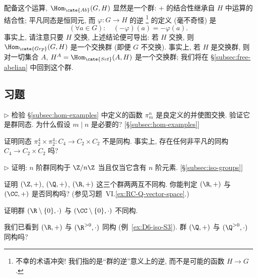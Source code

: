 配备这个运算, $\Hom_{\cate{Ab}}(G, H)$ 显然是一个群: $+$ 的结合性继承自 $H$ 中运算的结合性; 平凡同态是恒同元, 而 $\varphi : G \to H$ 的逆%
\footnote{不幸的术语冲突! 我们指的是``群的逆''意义上的逆, 而不是可能的函数 $H \to G$.}%
的定义 (毫不奇怪) 是
\[
(\forall a \in G): \quad (-\varphi)(a) = -\varphi(a).
\]
事实上, 请注意只要 $H$ 交换, 上述结论便可导出: 若 $H$ 交换, 则 $\Hom_{\cate{Grp}}(G, H)$ 是一个交换群 (即便 $G$ 不交换). 事实上, 若 $H$ 是交换群, 则对一切集合 $A$, $H^A = \Hom_{\cate{Set}}(A, H)$ 是一个交换群; 我们将在 \S\ref{subsec:free-abelian} 中回到这个群.

\subsection*{习题}
{}

\begin{prob}
\label{ex:pi-welldef}
$\triangleright$ 检验 \S\ref{subsec:hom-examples} 中定义的函数 $\pi_m^n$ 是良定义的并使图交换. 验证它是群同态. 为什么假设 $m \mid n$ 是必要的? [\S\ref{subsec:hom-examples}]
\end{prob}

\begin{prob}
\label{ex:c4-c2c2}
证明同态 $\pi_2^4 \times \pi_2^4 : C_4 \to C_2 \times C_2$ 不是同构. 事实上, 存在任何非平凡的同构 $C_4 \to C_2 \times C_2$ 吗?
\end{prob}

\begin{prob}
\label{ex:cyclic-element-order}
$\triangleright$ 证明: $n$ 阶群同构于 $\Z/n\Z$ 当且仅当它含有 $n$ 阶元素. [\S\ref{subsec:iso-groups}]
\end{prob}

\begin{prob}
\label{ex:zqr-not-iso}
证明 $(\Z, +)$, $(\Q, +)$, $(\R, +)$ 这三个群两两互不同构. 你能判定 $(\R, +)$ 与 $(\CC, +)$ 是否同构吗? (参见习题~VI.\ref{ex:RC-Q-vector-space}.)
\end{prob}

\begin{prob}
\label{ex:R-C-not-iso}
证明群 $(\R \setminus \{0\}, \cdot)$ 与 $(\CC \setminus \{0\}, \cdot)$ 不同构.
\end{prob}

\begin{prob}
\label{ex:Q-positive}
我们已看到 $(\R, +)$ 与 $(\R^{>0}, \cdot)$ 同构 (例~\ref{ex:D6-iso-S3}). 群 $(\Q, +)$ 与 $(\Q^{>0}, \cdot)$ 同构吗?
\end{prob}

